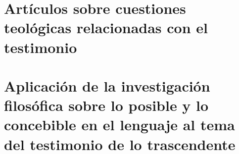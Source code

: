 

\section{Artículos sobre cuestiones teológicas relacionadas con el testimonio}



\setcounter{subsubsection}{1}


\setcounter{subsubsection}{2}


\setcounter{subsubsection}{3}


\setcounter{subsubsection}{4}


\section{Aplicación de la investigación filosófica sobre lo posible y lo concebible en el lenguaje al tema del testimonio de lo trascendente}




\setcounter{subsubsection}{0}
%

\setcounter{subsubsection}{1}
%

